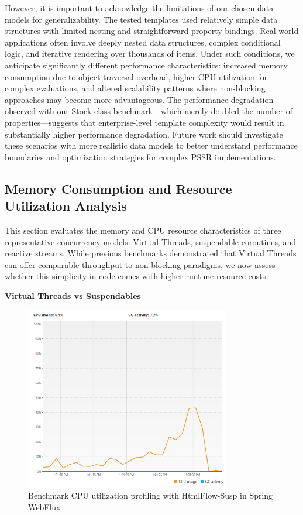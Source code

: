 However, it is important to acknowledge the limitations of our chosen data
models for generalizability. The tested templates used relatively simple data
structures with limited nesting and straightforward property bindings.
Real-world applications often involve deeply nested data structures, complex
conditional logic, and iterative rendering over thousands of items. Under such
conditions, we anticipate significantly different performance characteristics:
increased memory consumption due to object traversal overhead, higher CPU
utilization for complex evaluations, and altered scalability patterns where
non-blocking approaches may become more advantageous. The performance
degradation observed with our Stock class benchmark—which merely doubled the
number of properties—suggests that enterprise-level template complexity would
result in substantially higher performance degradation. Future work should
investigate these scenarios with more realistic data models to better
understand performance boundaries and optimization strategies for complex PSSR
implementations.

\subsection{Memory Consumption and Resource Utilization Analysis}

This section evaluates the memory and CPU resource characteristics of three
representative concurrency models: Virtual Threads, suspendable coroutines, and
reactive streams. While previous benchmarks demonstrated that Virtual Threads
can offer comparable throughput to non-blocking paradigms, we now assess
whether this simplicity in code comes with higher runtime resource costs.

\textbf{Virtual Threads vs Suspendables}

\begin{figure}[h]
     \centering
     \includegraphics[width=0.8\textwidth]{./Graphs/cpu-susp.png}
     \caption{Benchmark CPU utilization profiling with HtmlFlow-Susp in Spring WebFlux}\label{fig:cpu-susp}
\end{figure}

